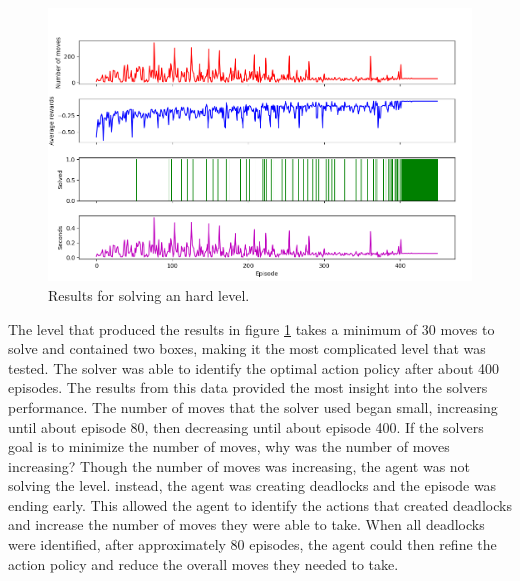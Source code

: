 \documentclass[times, 10pt,twocolumn]{article}
\begin{document}
\begin{figure}[h] 
  \centering
     \includegraphics[width=\linewidth]{images/hard_graph.png}
  \caption{Results for solving an hard level.}
  \label{fig:h}
\end{figure}

The level that produced the results in figure \ref{fig:h} takes a minimum of 30 moves to solve and contained two boxes, making it the most complicated level that was tested. The solver was able to identify the optimal action policy after about 400 episodes. The results from this data provided the most insight into the solvers performance. The number of moves that the solver used began small, increasing until about episode 80, then decreasing until about episode 400. If the solvers goal is to minimize the number of moves, why was the number of moves increasing? Though the number of moves was increasing, the agent was not solving the level. instead, the agent was creating deadlocks and the episode was ending early. This allowed the agent to identify the actions that created deadlocks and increase the number of moves they were able to take. When all deadlocks were identified, after approximately 80 episodes, the agent could then refine the action policy and reduce the overall moves they needed to take.






\end{document}
